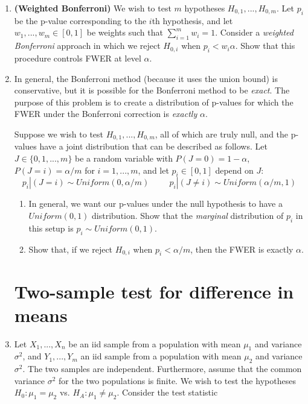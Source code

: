 \documentclass[11pt]{article}
\begin{document}
\begin{enumerate}
\bigskip

\item \textbf{(Weighted Bonferroni)} We wish to test $m$ hypotheses $H_{0,1},...,H_{0,m}$. Let $p_i$ be the p-value corresponding to the $i$th hypothesis, and let $w_1,...,w_m \in [0,1]$ be weights such that $\sum \limits_{i=1}^m w_i = 1$. Consider a \textit{weighted Bonferroni} approach in which we reject $H_{0,i}$ when $p_i < w_i \alpha$. Show that this procedure controls FWER at level $\alpha$.

\bigskip

\item In general, the Bonferroni method (because it uses the union bound) is conservative, but it is possible for the Bonferroni method to be \textit{exact}. The purpose of this problem is to create a distribution of p-values for which the FWER under the Bonferroni correction is \textit{exactly} $\alpha$. 

Suppose we wish to test $H_{0,1},...,H_{0,m}$, all of which are truly null, and the p-values have a joint distribution that can be described as follows. Let $J \in \{0,1,...,m\}$ be a random variable with $P(J = 0) = 1 - \alpha$, $P(J = i) = \alpha/m$ for $i = 1,...,m$, and let $p_i \in [0, 1]$ depend on $J$:
$$p_i | (J = i) \sim Uniform(0, \alpha/m) \hspace{1cm} p_i | (J \neq i) \sim Uniform(\alpha/m, 1)$$
\begin{enumerate}
\item In general, we want our p-values under the null hypothesis to have a $Uniform(0, 1)$ distribution. Show that the \textit{marginal} distribution of $p_i$ in this setup is $p_i \sim Uniform(0, 1)$.

\item Show that, if we reject $H_{0,i}$ when $p_i < \alpha/m$, then the FWER is exactly $\alpha$.
\end{enumerate}

\bigskip

\section*{Two-sample test for difference in means}

\item Let $X_1,...,X_n$ be an iid sample from a population with mean $\mu_1$ and variance $\sigma^2$, and $Y_1,...,Y_m$ an iid sample from a population with mean $\mu_2$ and variance $\sigma^2$. The two samples are independent. Furthermore, assume that the common variance $\sigma^2$ for the two populations is finite. We wish to test the hypotheses $H_0: \mu_1 = \mu_2$ vs. $H_A: \mu_1 \neq \mu_2$. Consider the test statistic


\end{enumerate}
\end{document}
